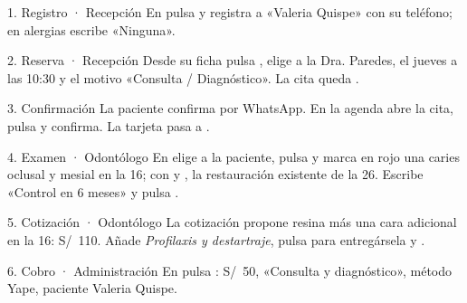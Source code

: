 \documentclass[11pt]{article}
\begin{document}
\begin{sdpaso}{1. Registro · Recepción}
En  pulsa  y registra a «Valeria Quispe» con su teléfono; en alergias escribe «Ninguna».
\end{sdpaso}
\begin{sdpaso}{2. Reserva · Recepción}
Desde su ficha pulsa , elige a la Dra. Paredes, el jueves a las 10:30 y el motivo «Consulta / Diagnóstico». La cita queda .
\end{sdpaso}
\begin{sdpaso}{3. Confirmación}
La paciente confirma por WhatsApp. En la agenda abre la cita, pulsa  y confirma. La tarjeta pasa a .
\end{sdpaso}
\begin{sdpaso}{4. Examen · Odontólogo}
En  elige a la paciente, pulsa  y marca en rojo una caries oclusal y mesial en la 16; con  y , la restauración existente de la 26. Escribe «Control en 6 meses» y pulsa .
\end{sdpaso}
\begin{sdpaso}{5. Cotización · Odontólogo}
La cotización propone resina más una cara adicional en la 16: S/~110. Añade \textit{Profilaxis y destartraje}, pulsa  para entregársela y .
\end{sdpaso}
\begin{sdpaso}{6. Cobro · Administración}
En  pulsa : S/~50, «Consulta y diagnóstico», método Yape, paciente Valeria Quispe.
\end{sdpaso}

\label{sec:problemas}
\end{document}
